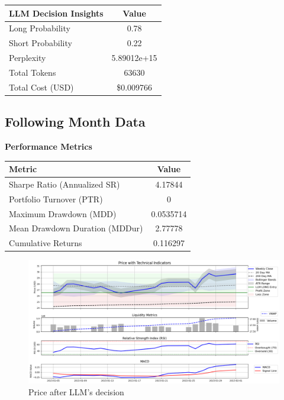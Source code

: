 \documentclass[8pt]{scrartcl}
\begin{document}
\begin{longtable}{l c}
\toprule
\textbf{LLM Decision Insights} & \textbf{Value} \\
\midrule
Long Probability & 0.78 \\
Short Probability & 0.22 \\
Perplexity & 5.89012e+15 \\
\midrule
Total Tokens & 63630 \\
Total Cost (USD) & \$0.009766 \\
\bottomrule
\end{longtable}

\subsection*{Following Month Data}

\textbf{Performance Metrics}

\begin{longtable}{l c}
\toprule
\textbf{Metric} & \textbf{Value} \\
\midrule
Sharpe Ratio (Annualized SR) & 4.17844 \\
Portfolio Turnover (PTR) & 0 \\
Maximum Drawdown (MDD) & 0.0535714 \\
Mean Drawdown Duration (MDDur) & 2.77778 \\
Cumulative Returns & 0.116297 \\
\bottomrule
\end{longtable}

\begin{figure}[H]
    \centering
    \includegraphics[width=1\linewidth]{judge_reviews/AAPL_M_gpt-4o-mini//2015-01-01/llm_Price_with_Technical_Indicators.png}
    \caption{Price after LLM's decision}
\end{figure}
\end{document}
